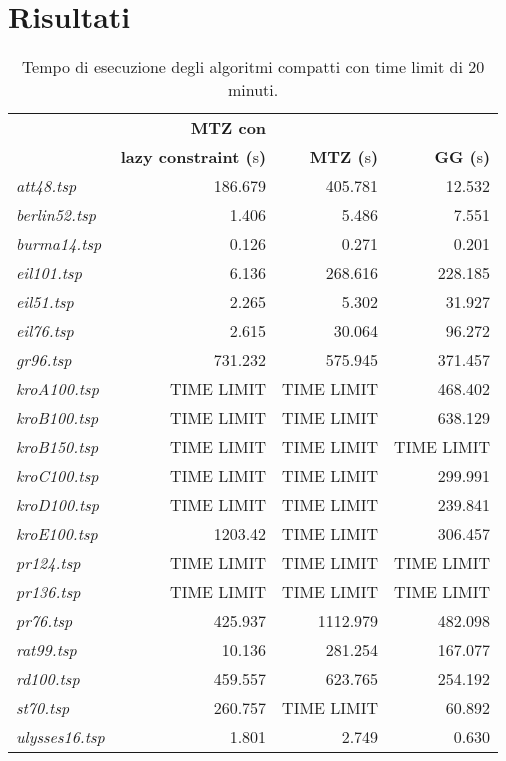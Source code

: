 \chapter{Risultati}\label{results}
{\footnotesize
\begin{longtable}[H]{lrrr}
\caption{Tempo di esecuzione degli algoritmi compatti con time limit di 20 minuti.}\\
\hline
{} & \textbf{MTZ con} & {} & {}\\
{} & \textbf{lazy constraint (}s\textbf{)} & \textbf{MTZ (}s\textbf{)} & \textbf{GG (}s\textbf{)}\\
\hline
\textit{att48.tsp} & 186.679 & 405.781 & 12.532\\
\textit{berlin52.tsp} & 1.406 & 5.486 & 7.551\\
\textit{burma14.tsp} & 0.126 & 0.271 & 0.201\\
\textit{eil101.tsp} & 6.136 & 268.616 & 228.185\\
\textit{eil51.tsp} & 2.265 & 5.302 & 31.927\\
\textit{eil76.tsp} & 2.615 & 30.064 & 96.272\\
\textit{gr96.tsp} & 731.232 & 575.945 & 371.457\\
\textit{kroA100.tsp} & TIME LIMIT & TIME LIMIT & 468.402\\
\textit{kroB100.tsp} & TIME LIMIT & TIME LIMIT & 638.129\\
\textit{kroB150.tsp} & TIME LIMIT & TIME LIMIT & TIME LIMIT\\
\textit{kroC100.tsp} & TIME LIMIT & TIME LIMIT & 299.991\\
\textit{kroD100.tsp} & TIME LIMIT & TIME LIMIT & 239.841\\
\textit{kroE100.tsp} & 1203.42 & TIME LIMIT & 306.457\\
\textit{pr124.tsp} & TIME LIMIT & TIME LIMIT & TIME LIMIT\\
\textit{pr136.tsp} & TIME LIMIT & TIME LIMIT & TIME LIMIT\\
\textit{pr76.tsp} & 425.937 & 1112.979 & 482.098\\
\textit{rat99.tsp} & 10.136 & 281.254 & 167.077\\
\textit{rd100.tsp} & 459.557 & 623.765 & 254.192\\
\textit{st70.tsp} & 260.757 & TIME LIMIT & 60.892\\
\textit{ulysses16.tsp} & 1.801 & 2.749 & 0.630\\
\hline
\end{longtable}
}

